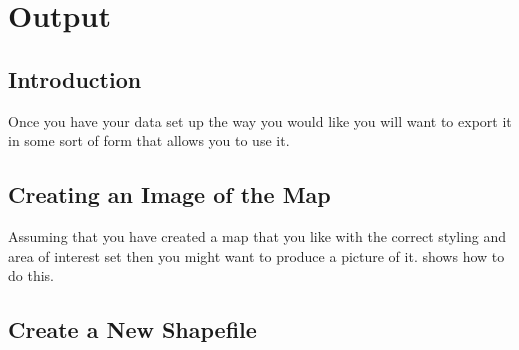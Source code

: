 \chapter{Output}

\section{Introduction}
Once you have your data set up the way you would like you will want 
to export it in some sort of form that allows you to use it.

\section{Creating an Image of the Map}
Assuming that you have created a map that you like with the correct styling and area of interest 
set then you might want to produce a picture of it.  shows how to do this.




\section{Create a New Shapefile}




